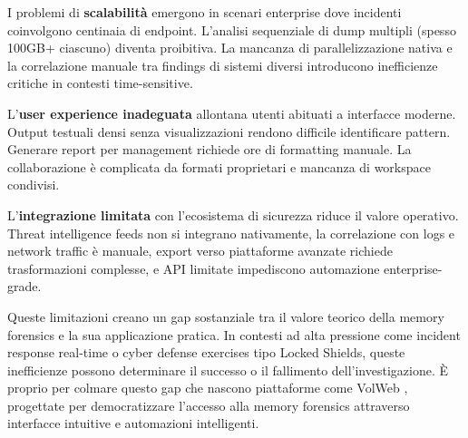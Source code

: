 I problemi di \textbf{scalabilità} emergono in scenari enterprise dove incidenti coinvolgono centinaia di endpoint. L'analisi sequenziale di dump multipli (spesso 100GB+ ciascuno) diventa proibitiva. La mancanza di parallelizzazione nativa e la correlazione manuale tra findings di sistemi diversi introducono inefficienze critiche in contesti time-sensitive.

L'\textbf{user experience inadeguata} allontana utenti abituati a interfacce moderne. Output testuali densi senza visualizzazioni rendono difficile identificare pattern. Generare report per management richiede ore di formatting manuale. La collaborazione è complicata da formati proprietari e mancanza di workspace condivisi.

L'\textbf{integrazione limitata} con l'ecosistema di sicurezza riduce il valore operativo. Threat intelligence feeds non si integrano nativamente, la correlazione con logs e network traffic è manuale, export verso piattaforme avanzate richiede trasformazioni complesse, e API limitate impediscono automazione enterprise-grade.

Queste limitazioni creano un gap sostanziale tra il valore teorico della memory forensics e la sua applicazione pratica. In contesti ad alta pressione come incident response real-time o cyber defense exercises tipo Locked Shields, queste inefficienze possono determinare il successo o il fallimento dell'investigazione. È proprio per colmare questo gap che nascono piattaforme come VolWeb \cite{volweb2024}, progettate per democratizzare l'accesso alla memory forensics attraverso interfacce intuitive e automazioni intelligenti.
